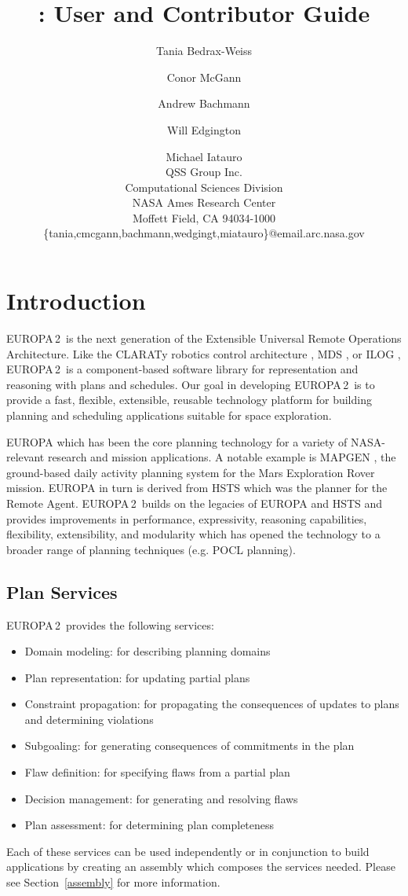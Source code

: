 \documentclass[10pt, letterpaper, twoside]{article}
\author{Tania Bedrax-Weiss \and Conor McGann \and Andrew Bachmann \and Will Edgington \and Michael Iatauro \\
QSS Group Inc. \\
Computational Sciences Division \\
NASA Ames Research Center \\
Moffett Field, CA 94034-1000 \\
\{tania,cmcgann,bachmann,wedgingt,miatauro\}@email.arc.nasa.gov
}
\title{\ET: User and Contributor Guide}
\begin{document}
\newcommand{\ET}{EUROPA\,2}

\maketitle

\tableofcontents

\section{Introduction}
\label{intro}
\ET\, is the next generation of the Extensible Universal Remote
Operations Architecture.  Like the CLARATy robotics control architecture
\cite{kn:Ne}, MDS \cite{MDS}, or ILOG \cite{ILOG}, \ET\, is a
component-based software library for representation and reasoning with
plans and schedules. Our goal in developing \ET\, is to provide a fast,
flexible, extensible, reusable technology platform for building planning
and scheduling applications suitable for space exploration.

EUROPA \cite{caip,plan} which has been the core planning technology for a
variety of NASA-relevant research and mission applications. A notable
example is MAPGEN \cite{mapgen}, the ground-based daily activity planning
system for the Mars Exploration Rover mission. EUROPA in turn is derived
from HSTS which was the planner for the Remote Agent\cite{ra}. \ET\,
builds on the legacies of EUROPA and HSTS and provides improvements in
performance, expressivity, reasoning capabilities, flexibility,
extensibility, and modularity which has opened the technology to a broader
range of planning techniques (e.g. POCL planning).

\subsection{Plan Services}
\label{services}
\ET\, provides the following services:
\begin{itemize}
\item Domain modeling: for describing planning domains
\item Plan representation: for updating partial plans 
\item Constraint propagation: for propagating the consequences of updates
to plans and determining violations
\item Subgoaling: for generating consequences of commitments in the plan
\item Flaw definition: for specifying flaws from a partial plan
\item Decision management: for generating and resolving flaws
\item Plan assessment: for determining plan completeness
\end{itemize}
Each of these services can be used independently or in conjunction to build
applications by creating an assembly which composes the services
needed. Please see Section~\ref{assembly} for more information.
\end{document}
